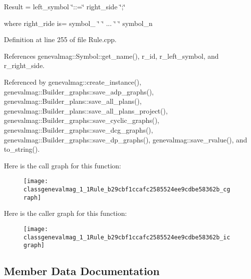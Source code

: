 Result = left\_\-symbol \char`\"{}::=\char`\"{} right\_\-side \char`\"{};\char`\"{}

where right\_\-ride is= symbol\_ \char`\"{} \char`\"{} ... \char`\"{} \char`\"{} symbol\_\-n 

Definition at line 255 of file Rule.cpp.

References genevalmag::Symbol::get\_\-name(), r\_\-id, r\_\-left\_\-symbol, and r\_\-right\_\-side.

Referenced by genevalmag::create\_\-instance(), genevalmag::Builder\_\-graphs::save\_\-adp\_\-graphs(), genevalmag::Builder\_\-plans::save\_\-all\_\-plans(), genevalmag::Builder\_\-plans::save\_\-all\_\-plans\_\-project(), genevalmag::Builder\_\-graphs::save\_\-cyclic\_\-graphs(), genevalmag::Builder\_\-graphs::save\_\-dcg\_\-graphs(), genevalmag::Builder\_\-graphs::save\_\-dp\_\-graphs(), genevalmag::save\_\-rvalue(), and to\_\-string().

Here is the call graph for this function:\nopagebreak
\begin{figure}[H]
\begin{center}
\leavevmode
\texttt{[image: classgenevalmag\_1\_1Rule\_b29cbf1ccafc2585524ee9cdbe58362b\_cgraph]}
\end{center}
\end{figure}


Here is the caller graph for this function:\nopagebreak
\begin{figure}[H]
\begin{center}
\leavevmode
\texttt{[image: classgenevalmag\_1\_1Rule\_b29cbf1ccafc2585524ee9cdbe58362b\_icgraph]}
\end{center}
\end{figure}


\subsection{Member Data Documentation}
\hypertarget{classgenevalmag_1_1Rule_acf0a4aeb6ca8e955490731de96902d2}{
\subsubsection[{r\_\-eqs}]{}}
\label{classgenevalmag_1_1Rule_acf0a4aeb6ca8e955490731de96902d2}


